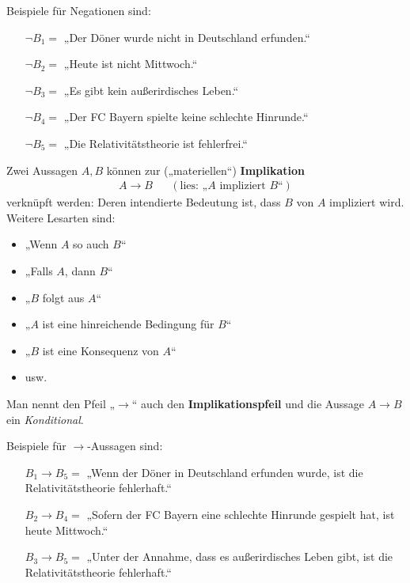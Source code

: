 \begin{bsp}    
    Beispiele für Negationen sind:
    \begin{itemize}[labelindent=1.5em, leftmargin=!, labelwidth=]
        \item[$\neg B_1 =$] „Der Döner wurde nicht in Deutschland erfunden.“
        \item[$\neg B_2 =$] „Heute ist nicht Mittwoch.“
        \item[$\neg B_3 =$] „Es gibt kein außerirdisches Leben.“
        \item[$\neg B_4 =$] „Der FC Bayern spielte keine schlechte Hinrunde.“
        \item[$\neg B_5 =$] „Die Relativitätstheorie ist fehlerfrei.“
    \end{itemize}
\end{bsp}


\begin{defin}[Implikationspfeil] 
    Zwei Aussagen $A,B$ können zur („materiellen“) \textbf{Implikation}
    \begin{align*}
        A\to B   && (\text{lies: „$A$ impliziert $B$“})
    \end{align*}
    verknüpft werden: Deren intendierte Bedeutung ist, dass $B$ von $A$ impliziert wird. Weitere Lesarten sind:
    \begin{itemize}
        \item „Wenn $A$ so auch $B$“
        \item „Falls $A$, dann $B$“
        \item „$B$ folgt aus $A$“
        \item „$A$ ist eine hinreichende Bedingung für $B$“
        \item „$B$ ist eine Konsequenz von $A$“
        \item usw.
    \end{itemize}
    Man nennt den Pfeil „$\to$“ auch den \textbf{Implikationspfeil} und die Aussage $A\to B$ ein \emph{Konditional}.
\end{defin}


\begin{bsp}
    Beispiele für $\to$-Aussagen sind:
    \begin{itemize}[labelindent=1.5em, leftmargin=!, labelwidth=]
        \item[$B_1\to B_5=$] „Wenn der Döner in Deutschland erfunden wurde, ist die Relativitätstheorie fehlerhaft.“
        \item[$B_2\to B_4=$] „Sofern der FC Bayern eine schlechte Hinrunde gespielt hat, ist heute Mittwoch.“
        \item[$B_3\to B_5=$] „Unter der Annahme, dass es außerirdisches Leben gibt, ist die Relativitätstheorie fehlerhaft.“
    \end{itemize}
\end{bsp}


